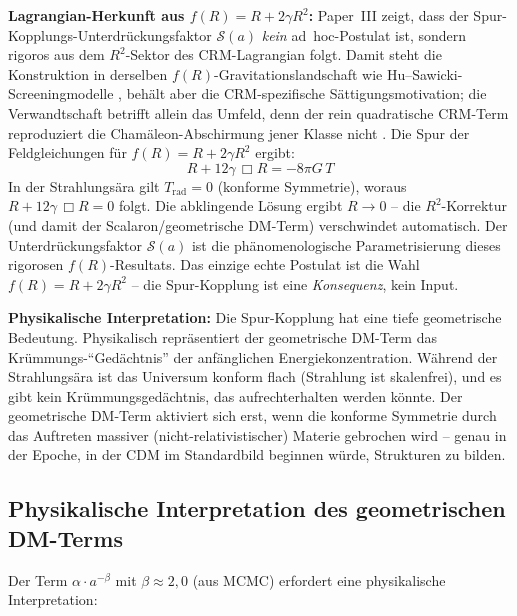 \documentclass[aps,prd,twocolumn,superscriptaddress,nofootinbib]{revtex4-2}
\begin{document}
\textbf{Lagrangian-Herkunft aus $f(R) = R + 2\gamma R^2$:} Paper~III \cite{Geiger2026c} zeigt, dass der Spur-Kopplungs-Unterdr\"uckungsfaktor $\mathcal{S}(a)$ \textit{kein} ad~hoc-Postulat ist, sondern rigoros aus dem $R^2$-Sektor des CRM-Lagrangian folgt. Damit steht die Konstruktion in derselben $f(R)$-Gravitationslandschaft wie Hu--Sawicki-Screeningmodelle \cite{HuSawicki2007}, beh\"alt aber die CRM-spezifische S\"attigungsmotivation; die Verwandtschaft betrifft allein das Umfeld, denn der rein quadratische CRM-Term reproduziert die Cham\"aleon-Abschirmung jener Klasse nicht \cite{Geiger2026c}. Die Spur der Feldgleichungen f\"ur $f(R) = R + 2\gamma R^2$ ergibt:
\begin{equation}
R + 12\gamma\,\Box R = -8\pi G\,T
\end{equation}
In der Strahlungs\"ara gilt $T_{\mathrm{rad}} = 0$ (konforme Symmetrie), woraus $R + 12\gamma\,\Box R = 0$ folgt. Die abklingende L\"osung ergibt $R \to 0$ -- die $R^2$-Korrektur (und damit der Scalaron/geometrische DM-Term) verschwindet automatisch. Der Unterdr\"uckungsfaktor $\mathcal{S}(a)$ ist die ph\"anomenologische Parametrisierung dieses rigorosen $f(R)$-Resultats. Das einzige echte Postulat ist die Wahl $f(R) = R + 2\gamma R^2$ -- die Spur-Kopplung ist eine \textit{Konsequenz}, kein Input.

\textbf{Physikalische Interpretation:} Die Spur-Kopplung hat eine tiefe geometrische Bedeutung. Physikalisch repr\"asentiert der geometrische DM-Term das Kr\"ummungs-"`Ged\"achtnis"' der anf\"anglichen Energiekonzentration. W\"ahrend der Strahlungs\"ara ist das Universum konform flach (Strahlung ist skalenfrei), und es gibt kein Kr\"ummungsged\"achtnis, das aufrechterhalten werden k\"onnte. Der geometrische DM-Term aktiviert sich erst, wenn die konforme Symmetrie durch das Auftreten massiver (nicht-relativistischer) Materie gebrochen wird -- genau in der Epoche, in der CDM im Standardbild beginnen w\"urde, Strukturen zu bilden.

\subsection{Physikalische Interpretation des geometrischen DM-Terms}

Der Term $\alpha \cdot a^{-\beta}$ mit $\beta \approx 2{,}0$ (aus MCMC) erfordert eine physikalische Interpretation:
\end{document}
